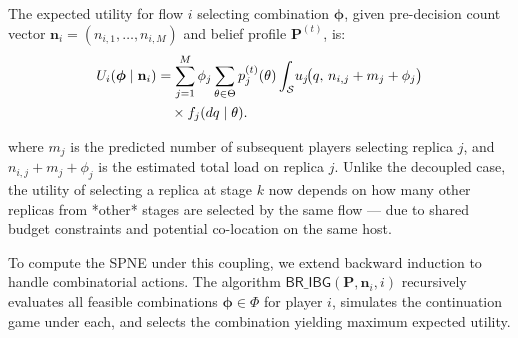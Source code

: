 \documentclass[journal]{IEEEtran}
\theoremstyle{plain}
\theoremstyle{definition}
\theoremstyle{remark}
\begin{document}
The expected utility for flow $i$ selecting combination $\boldsymbol{\phi}$, given pre-decision count vector $\mathbf{n}_i = (n_{i,1}, \dots, n_{i,M})$ and belief profile $\mathbf{P}^{(t)}$, is:
\begin{align}
U_i(\boldsymbol{\phi} \mid \mathbf{n}_i)
&= \sum_{j=1}^M \phi_j
   \sum_{\theta \in \Theta} p_{j}^{(t)}(\theta)
   \int_{\mathcal{S}} \!
   u_j\!\big(q,\, n_{i,j} + m_j + \phi_j\big)
   \notag\\
&\quad\times f_j(dq \mid \theta).
\label{eq:Ui_split}
\end{align}


where $m_j$ is the predicted number of subsequent players selecting replica $j$, and $n_{i,j} + m_j + \phi_j$ is the estimated total load on replica $j$. Unlike the decoupled case, the utility of selecting a replica at stage $k$ now depends on how many other replicas from *other* stages are selected by the same flow — due to shared budget constraints and potential co-location on the same host.

To compute the SPNE under this coupling, we extend backward induction to handle combinatorial actions. The algorithm $\textsf{BR\_IBG}(\mathbf{P}, \mathbf{n}_i, i)$ recursively evaluates all feasible combinations $\boldsymbol{\phi} \in \Phi$ for player $i$, simulates the continuation game under each, and selects the combination yielding maximum expected utility.
\end{document}
